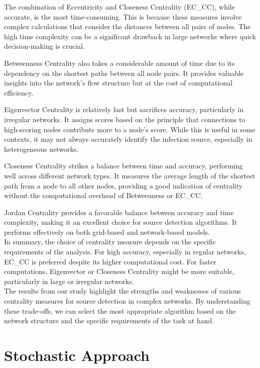 The combination of Eccentricity and Closeness Centrality (EC\_CC), while accurate, is the most time-consuming. This is because these measures involve complex calculations that consider the distances between all pairs of nodes. The high time complexity can be a significant drawback in large networks where quick decision-making is crucial.

Betweenness Centrality also takes a considerable amount of time due to its dependency on the shortest paths between all node pairs. It provides valuable insights into the network's flow structure but at the cost of computational efficiency.

Eigenvector Centrality is relatively fast but sacrifices accuracy, particularly in irregular networks. It assigns scores based on the principle that connections to high-scoring nodes contribute more to a node's score. While this is useful in some contexts, it may not always accurately identify the infection source, especially in heterogeneous networks.

Closeness Centrality strikes a balance between time and accuracy, performing well across different network types. It measures the average length of the shortest path from a node to all other nodes, providing a good indication of centrality without the computational overhead of Betweenness or EC\_CC.

Jordan Centrality provides a favorable balance between accuracy and time complexity, making it an excellent choice for source detection algorithms. It performs effectively on both grid-based and network-based models.\\

In summary, the choice of centrality measure depends on the specific requirements of the analysis. For high accuracy, especially in regular networks, EC\_CC is preferred despite its higher computational cost. For faster computations, Eigenvector or Closeness Centrality might be more suitable, particularly in large or irregular networks.\\

The results from our study highlight the strengths and weaknesses of various centrality measures for source detection in complex networks. By understanding these trade-offs, we can select the most appropriate algorithm based on the network structure and the specific requirements of the task at hand.



\section{Stochastic Approach}

